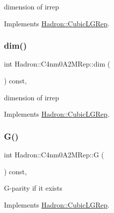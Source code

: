 dimension of irrep 

Implements \mbox{\hyperlink{structHadron_1_1CubicLGRep_a3acbaea26503ed64f20df693a48e4cdd}{Hadron\+::\+Cubic\+L\+G\+Rep}}.

\mbox{\label{structHadron_1_1C4nm0A2MRep_a74531346885cc1d3a3b3e7749bfbc5f7}} 
\subsubsection{\texorpdfstring{dim()}{dim()}\hspace{0.1cm}{\footnotesize\ttfamily [3/3]}}
{\footnotesize\ttfamily int Hadron\+::\+C4nm0\+A2\+M\+Rep\+::dim (\begin{DoxyParamCaption}{ }\end{DoxyParamCaption}) const\hspace{0.3cm}{\ttfamily [inline]}, {\ttfamily [virtual]}}

dimension of irrep 

Implements \mbox{\hyperlink{structHadron_1_1CubicLGRep_a3acbaea26503ed64f20df693a48e4cdd}{Hadron\+::\+Cubic\+L\+G\+Rep}}.

\mbox{\label{structHadron_1_1C4nm0A2MRep_a36640a5b382aca709c5523a79cef513f}} 
\subsubsection{\texorpdfstring{G()}{G()}\hspace{0.1cm}{\footnotesize\ttfamily [1/3]}}
{\footnotesize\ttfamily int Hadron\+::\+C4nm0\+A2\+M\+Rep\+::G (\begin{DoxyParamCaption}{ }\end{DoxyParamCaption}) const\hspace{0.3cm}{\ttfamily [inline]}, {\ttfamily [virtual]}}

G-\/parity if it exists 

Implements \mbox{\hyperlink{structHadron_1_1CubicLGRep_ace26f7b2d55e3a668a14cb9026da5231}{Hadron\+::\+Cubic\+L\+G\+Rep}}.

\mbox{\label{structHadron_1_1C4nm0A2MRep_a36640a5b382aca709c5523a79cef513f}} 
